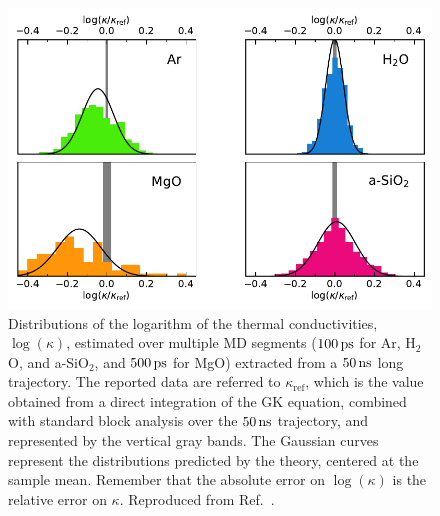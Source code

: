 \begin{figure}[!tb]
    \centering
    \includegraphics[width=\textwidth]{chapters/chapter5/figures/histograms.pdf}
    \caption{Distributions of the logarithm of the thermal conductivities, $\log(\kappa)$, estimated over multiple MD segments ($100\,\mathrm{ps}$ for Ar, H$_2$O, and a-SiO$_2$, and $500\,\mathrm{ps}$ for MgO) extracted from a $50\,\mathrm{ns}$ long trajectory. The reported data are referred to $\kappa_\mathrm{ref}$, which is the value obtained from a direct integration of the GK equation, combined with standard block analysis over the $50\,\mathrm{ns}$ trajectory, and represented by the vertical gray bands. The Gaussian curves represent the distributions predicted by the theory, centered at the sample mean. Remember that the absolute error on $\log(\kappa)$ is the relative error on $\kappa$. Reproduced from Ref.~\cite{Ercole2017}.
    }
    \label{fig:histograms}
\end{figure}
